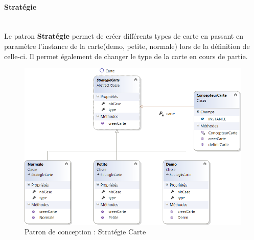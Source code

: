 \documentclass[a4paper,11pt]{article}
\begin{document}
\paragraph{Stratégie}\mbox{}\medskip\\
Le patron \textbf{Stratégie} permet de créer différents types de carte en passant en paramètre l'instance de la carte(demo, petite, normale) lors de la définition de celle-ci. Il permet également de changer le type de la carte en cours de partie.
\begin{figure}[H]
	\centering
	\includegraphics[width=\textwidth]{fig/strategie_carte}
	\caption{Patron de conception : Stratégie Carte}
	\label{pc:sc}
\end{figure}
\end{document}
